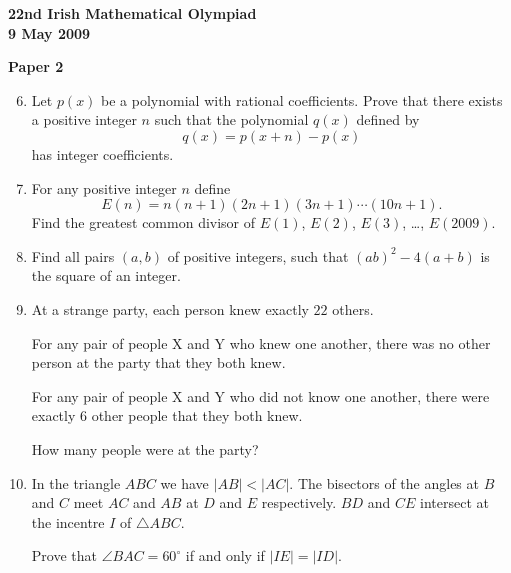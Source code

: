 \documentclass[12pt]{article}
\begin{document}
\newpage
\begin{center}
{\large\bfseries 22nd Irish Mathematical Olympiad\\9 May 2009}
\end{center}
\bigskip\noindent\textbf{Paper 2}\bigskip
\begin{enumerate}
\setcounter{enumi}{5}
\item Let $p(x)$ be a polynomial with rational coefficients. Prove that there exists a positive integer $n$ such that the polynomial $q(x)$ defined by
\[
q(x) = p(x+n) - p(x)
\]
has integer coefficients.

\item For any positive integer $n$ define
\[
E(n) = n(n+1)(2n+1)(3n+1)\cdots(10n+1).
\]
Find the greatest common divisor of $E(1)$, $E(2)$, $E(3)$, \ldots, $E(2009)$.

\item Find all pairs $(a,b)$ of positive integers, such that $(ab)^2 - 4(a+b)$ is the square of an integer.

\item At a strange party, each person knew exactly $22$ others.

For any pair of people X and Y who knew one another, there was no other person at the party that they both knew.

For any pair of people X and Y who did not know one another, there were exactly $6$ other people that they both knew.

How many people were at the party?

\item In the triangle $ABC$ we have $|AB| < |AC|$. The bisectors of the angles at $B$ and $C$ meet $AC$ and $AB$ at $D$ and $E$ respectively. $BD$ and $CE$ intersect at the incentre $I$ of $\triangle ABC$.

Prove that $\angle BAC = 60^\circ$ if and only if $|IE| = |ID|$.
\end{enumerate}
\end{document}
